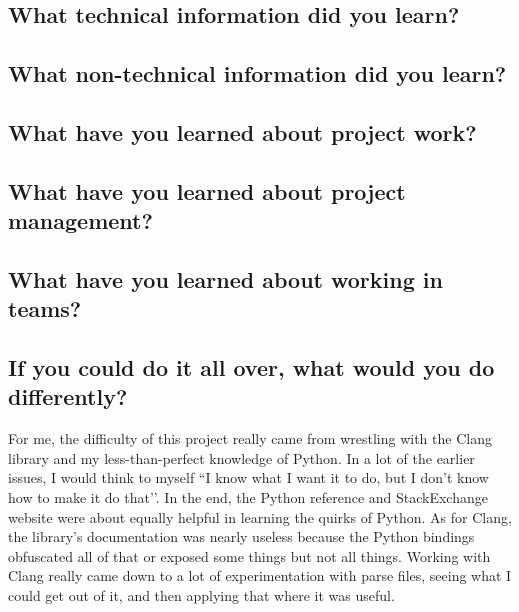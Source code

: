 \documentclass[11pt]{scrreprt}
\begin{document}
\subsection{What technical information did you learn?}
\subsection{What non-technical information did you learn?}
\subsection{What have you learned about project work?}
\subsection{What have you learned about project management?}
\subsection{What have you learned about working in teams?}
\subsection{If you could do it all over, what would you do differently?}

For me, the difficulty of this project really came from wrestling with the Clang library and my less-than-perfect knowledge of Python. In a lot of the earlier issues, I would think to myself ``I know what I want it to do, but I don’t know how to make it do that’’. In the end, the Python reference and StackExchange website were about equally helpful in learning the quirks of Python. As for Clang, the library’s documentation was nearly useless because the Python bindings obfuscated all of that or exposed some things but not all things. Working with Clang really came down to a lot of experimentation with parse files, seeing what I could get out of it, and then applying that where it was useful.
\end{document}
